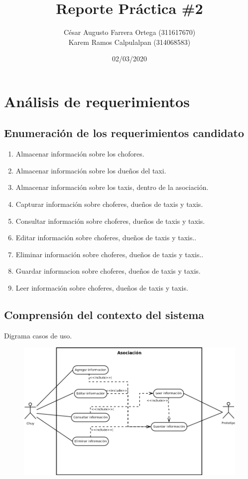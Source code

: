 \documentclass[
	10pt, %
	spanish %
]{fphw}
\title{Reporte Práctica \#2} %
\author{César Augusto Farrera Ortega (311617670) \\ Karem Ramos Calpulalpan (314068583)} %
\date{02/03/2020} %
\institute{UNAM \\ Facultad de Ciencias} %
\begin{document}
\maketitle %


\section*{Análisis de requerimientos}


\subsection*{Enumeración de los requerimientos candidato}
\begin{enumerate}
	\item Almacenar información sobre los chofores.
	\item Almacenar información sobre los dueños del taxi.
	\item Almacenar información sobre los taxis, dentro de la asociación.
	\item Capturar información sobre choferes, dueños de taxis y taxis.
	\item Consultar información sobre choferes, dueños de taxis y taxis.
	\item Editar información sobre choferes, dueños de taxis y taxis..
	\item Eliminar información sobre choferes, dueños de taxis y taxis..
	\item Guardar informacion sobre choferes, dueños de taxis y taxis.
	\item Leer información sobre choferes, dueños de taxis y taxis.
\end{enumerate}
\subsection*{Comprensión del contexto del sistema}
Digrama casos de uso.

\begin{figure}[h]
	\centering
	\includegraphics[scale=0.4]{DiagramaCasosDeUsoAsociacion.png}
\end{figure}
\end{document}
